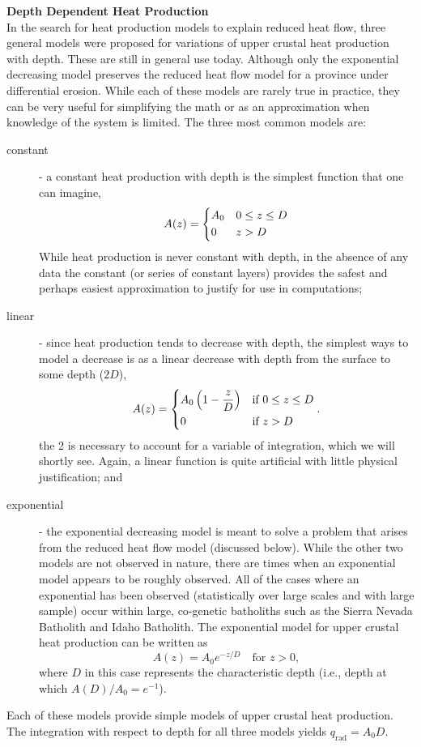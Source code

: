 {    \medskip
    \noindent\textbf{Depth Dependent Heat Production}\\
    In the search for heat production models to explain reduced heat flow, three general models were proposed for variations of upper crustal heat production with depth.  These are still in general use today.  Although only the exponential decreasing model preserves the reduced heat flow model for a province under differential erosion.  While each of these models are rarely true in practice, they can be very useful for simplifying the math or as an approximation when knowledge of the system is limited.  The three most common models are:
    \begin{description}
        \item[constant] - a constant heat production with depth is the simplest
        function that one can imagine,
        \[
            A(z) =
            \begin{dcases}
                A_0 & 0 \leq z \leq D \\
                0 & z > D
            \end{dcases}
        \]
        While heat production is never constant with depth, in the absence of any data the constant (or series of constant layers) provides the safest and perhaps easiest approximation to justify for use in computations;

        \item[linear] - since heat production tends to decrease with depth, the simplest ways to model a decrease is as a linear decrease with depth from the surface to some depth ($2D$),
        \[
            A(z) =
            \begin{dcases}
                A_0 \left( 1 - \frac{z}{D} \right) & \text{if } 0 \leq z \leq D \\
                0 & \text{if } z > D
            \end{dcases} .
        \]
        the 2 is necessary to account for a variable of integration, which we will shortly see.  Again, a linear function is quite artificial with little physical justification; and

        \item[exponential] - the exponential decreasing model is meant to solve a problem that arises from the reduced heat flow model (discussed below).  While the other two models are not observed in nature, there are times when an exponential model appears to be roughly observed.  All of the cases where an exponential has been observed (statistically over large scales and with large sample) occur within large, co-genetic batholiths such as the Sierra Nevada Batholith and Idaho Batholith.  The exponential model for upper crustal heat production can be written as
        \[
            A(z) = A_0 e^{-z/D} \quad \text{for } z > 0 ,
        \]
        where $D$ in this case represents the characteristic depth (i.e., depth at
        which $A(D)/A_0 = e^{-1}$).
    \end{description}
    Each of these models provide simple models of upper crustal heat production.  The integration with respect to depth for all three models yields $q_{\mathrm{rad}} = A_0 D$.

}
